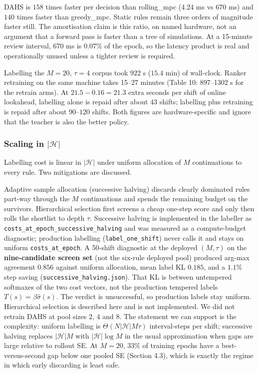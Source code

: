 \documentclass[review,3p,times]{elsarticle}
\theoremstyle{definition}
\begin{document}
DAHS is \(158\) times faster per decision than rolling\_mpc (4.24 ms vs
670 ms) and \(140\) times faster than greedy\_mpc. Static rules remain
three orders of magnitude faster still. The amortisation claim is this
ratio, on named hardware, not an argument that a forward pass is faster
than a tree of simulations. At a 15-minute review interval, 670 ms is
\(0.07\%\) of the epoch, so the latency product is real and
operationally unused unless a tighter review is required.

Labelling the \(M=20\), \(\tau=4\) corpus took \(922\) s (\(15.4\) min)
of wall-clock. Ranker retraining on the same machine takes 15--27
minutes (Table 10: 897--1302 s for the retrain arms). At
\(21.5-0.16=21.3\) extra seconds per shift of online lookahead,
labelling alone is repaid after about \(43\) shifts; labelling plus
retraining is repaid after about \(90\)--\(120\) shifts. Both figures
are hardware-specific and ignore that the teacher is also the better
policy.

\subsubsection{\texorpdfstring{Scaling in
\(|\mathcal{H}|\)}{Scaling in \textbar\textbackslash mathcal\{H\}\textbar{}}}\label{scaling-in-mathcalh}

Labelling cost is linear in \(|\mathcal{H}|\) under uniform allocation
of \(M\) continuations to every rule. Two mitigations are discussed.

Adaptive sample allocation (successive halving) discards clearly
dominated rules part-way through the \(M\) continuations and spends the
remaining budget on the survivors. Hierarchical selection first screens
a cheap one-step score and only then rolls the shortlist to depth
\(\tau\). Successive halving is implemented in the labeller as
\texttt{costs\_at\_epoch\_successive\_halving} and was measured as a
compute-budget diagnostic; production labelling
(\texttt{label\_one\_shift}) never calls it and stays on uniform
\texttt{costs\_at\_epoch}. A 50-shift diagnostic at the deployed
\((M,\tau)\) on the \textbf{nine-candidate screen set} (not the six-rule
deployed pool) produced arg-max agreement \(0.856\) against uniform
allocation, mean label KL \(0.185\), and a \(1.1\%\) step saving
(\texttt{successive\_halving.json}). That KL is between untempered
softmaxes of the two cost vectors, not the production tempered labels
\(T(s)=\beta\hat\sigma(s)\). The verdict is unsuccessful, so production
labels stay uniform. Hierarchical selection is described here and is not
implemented. We did not retrain DAHS at pool sizes \(2\), \(4\) and
\(8\). The statement we can support is the complexity: uniform labelling
is \(\Theta(N|\mathcal{H}|M\tau)\) interval-steps per shift; successive
halving replaces \(|\mathcal{H}|M\) with \(|\mathcal{H}|\log M\) in the
usual approximation when gaps are large relative to rollout SE. At
\(M=20\), \(33\%\) of training epochs have a best-versus-second gap
below one pooled SE (Section 4.3), which is exactly the regime in which
early discarding is least safe.
\end{document}
